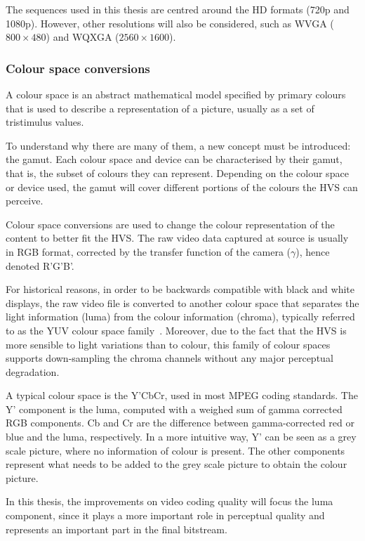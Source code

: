 \documentclass[11pt,a4paper,openright,twoside]{book}
\numberwithin{equation}{section} %
\numberwithin{figure}{section} %
\numberwithin{table}{section} %
\begin{document}
The sequences used in this thesis are centred around the \ac{HD} formats (720p
and 1080p).
However, other resolutions will also be considered, such as WVGA
($800\times480$) and WQXGA ($2560\times1600$).

\subsubsection{Colour space conversions}
\label{ssub:colour_space_conversions}

A colour space is an abstract mathematical model specified by primary colours
that is used to describe a representation of a picture, usually as a set of
tristimulus values.

To understand why there are many of them, a new concept must be introduced:
the gamut.
Each colour space and device can be characterised by their gamut, that is, the
subset of colours they can represent.
Depending on the colour space or device used, the gamut will cover different
portions of the colours the \ac{HVS} can perceive.

Colour space conversions are used to change the colour representation of the
content to better fit the \ac{HVS}.
The raw video data captured at source is usually in \ac{RGB} format, corrected
by the transfer function of the camera ($\gamma$), hence denoted R'G'B'.

For historical reasons, in order to be backwards compatible with black
and white displays, the raw video file is converted to another colour
space that separates the light information (luma) from the colour
information (chroma), typically referred to as the YUV colour space
family~\cite{poynton-95-color-space}.
Moreover, due to the fact that the \ac{HVS} is more sensible to light
variations than to colour, this family of colour spaces supports down-sampling
the chroma channels without any major perceptual degradation.

A typical colour space is the Y'CbCr, used in most MPEG coding standards.
The Y' component is the luma, computed with a weighed sum of gamma corrected
RGB components.
Cb and Cr are the difference between gamma-corrected red or blue and the luma,
respectively.
In a more intuitive way, Y' can be seen as a grey scale picture, where no
information of colour is present.
The other components represent what needs to be added to the grey scale
picture to obtain the colour picture.

In this thesis, the improvements on video coding quality will focus the luma
component, since it plays a more important role in perceptual quality and
represents an important part in the final bitstream.
\end{document}
